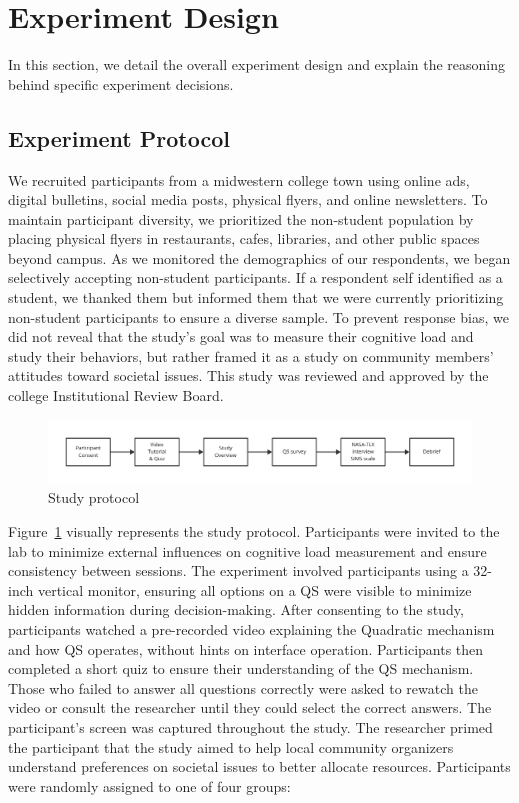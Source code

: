 \section{Experiment Design}
\label{sec:experiment}
In this section, we detail the overall experiment design and explain the reasoning behind specific experiment decisions.

\subsection{Experiment Protocol}
We recruited participants from a midwestern college town using online ads, digital bulletins, social media posts, physical flyers, and online newsletters. To maintain participant diversity, we prioritized the non-student population by placing physical flyers in restaurants, cafes, libraries, and other public spaces beyond campus. As we monitored the demographics of our respondents, we began selectively accepting non-student participants. If a respondent self identified as a student, we thanked them but informed them that we were currently prioritizing non-student participants to ensure a diverse sample. 
To prevent response bias, we did not reveal that the study's goal was to measure their cognitive load and study their behaviors, but rather framed it as a study on community members' attitudes toward societal issues. This study was reviewed and approved by the college Institutional Review Board.

\begin{figure}[ht]
    \centering
    \includegraphics[width=1\textwidth]{content/image/study_flow.pdf}
    \caption{Study protocol}
    \label{fig:studyProtocol}
\end{figure}

Figure~\ref{fig:studyProtocol} visually represents the study protocol. Participants were invited to the lab to minimize external influences on cognitive load measurement and ensure consistency between sessions. The experiment involved participants using a 32-inch vertical monitor, ensuring all options on a QS were visible to minimize hidden information during decision-making. After consenting to the study, participants watched a pre-recorded video explaining the Quadratic mechanism and how QS operates, without hints on interface operation. Participants then completed a short quiz to ensure their understanding of the QS mechanism. Those who failed to answer all questions correctly were asked to rewatch the video or consult the researcher until they could select the correct answers. The participant's screen was captured throughout the study. The researcher primed the participant that the study aimed to help local community organizers understand preferences on societal issues to better allocate resources. Participants were randomly assigned to one of four groups:

